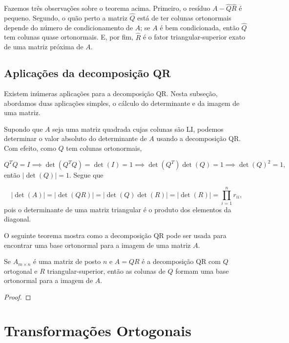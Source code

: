 \documentclass{article}
\begin{document}
Fazemos três observações sobre o teorema acima. Primeiro, o resíduo \(A - \hat{Q} \hat{R}\) é pequeno. Segundo, o quão perto a matriz \(\hat{Q}\) está de ter colunas ortonormais depende do número de condicionamento de \(A\); se \(A\) é bem condicionada, então \(\hat{Q}\) tem colunas quase ortonormais. E, por fim, \(\hat{R}\) é o fator triangular-superior exato de uma matriz próxima de \(A\).

\subsection{Aplicações da decomposição QR}

Existem inúmeras aplicações para a decomposição QR. Nesta subseção, abordamos duas aplicações simples, o cálculo do determinante e da imagem de uma matriz.

Supondo que \(A\) seja uma matriz quadrada cujas colunas são LI, podemos determinar o valor absoluto do determinante de \(A\) usando a decomposição QR. Com efeito, como \(Q\) tem colunas ortonormais,

\begin{equation*}
    Q^TQ = I \implies \det(Q^TQ) = \det(I) = 1 \implies \det(Q^T)\det(Q) = 1 \implies \det(Q)^2 = 1,
\end{equation*}
então \(\vert \det(Q) \vert = 1\). Segue que

\begin{equation*}
    \vert \det(A) \vert = \vert \det(QR) \vert = \vert \det(Q) \det(R) \vert = \vert \det(R) \vert = \prod_{i=1}^n r_{ii},
\end{equation*}
pois o determinante de uma matriz triangular é o produto dos elementos da diagonal.

O seguinte teorema mostra como a decomposição QR pode ser usada para encontrar uma base ortonormal para a imagem de uma matriz \(A\).

\begin{thm}
    Se \(A_{m \times n}\) é uma matriz de posto \(n\) e \(A = QR\) é a decomposição QR com \(Q\) ortogonal e \(R\) triangular-superior, então as colunas de \(Q\) formam uma base ortonormal para a imagem de \(A\).
\end{thm}

\begin{proof}
    
\end{proof}

\section{Transformações Ortogonais}
\end{document}
